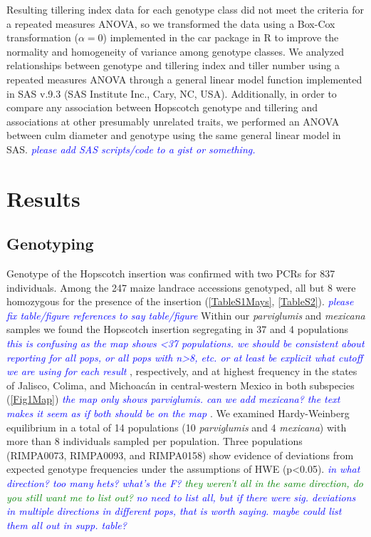 \documentclass[12pt]{article}
\newcommand{\jri}[1]{\textcolor{blue}{ \emph{\scriptsize  #1}} }
\newcommand{\lev}[1]{\textcolor{green}{\emph{\scriptsize #1}} }
\begin{document}
Resulting tillering index data for each genotype class did not meet the criteria for a repeated measures ANOVA, so we transformed the data using a Box-Cox transformation ($\alpha=0$) implemented in the car package in R \citep{FoxWeisberg2011} to improve the normality and homogeneity of variance among genotype classes.  We analyzed relationships between genotype and tillering index and tiller number using a repeated measures ANOVA through a general linear model function implemented in SAS v.9.3 (SAS Institute Inc., Cary, NC, USA). Additionally, in order to compare any association between Hopscotch genotype and tillering and associations at other presumably unrelated traits, we performed an ANOVA between culm diameter and genotype using the same general linear model in SAS. \jri{please add SAS scripts/code to a gist or something. }

\section*{Results}

\subsection*{Genotyping}

Genotype of the Hopscotch insertion was confirmed with two PCRs for 837 individuals. Among the 247 maize landrace accessions genotyped, all but 8 were homozygous for the presence of the insertion (\ref{TableS1Mays}, \ref{TableS2}). \jri{please fix table/figure references to say table/figure} Within our \emph{parviglumis} and \emph{mexicana} samples we found the Hopscotch insertion segregating in 37 and 4 populations \jri{this is confusing as the map shows <37 populations. we should be consistent about reporting for all pops, or all pops with n>8, etc. or at least be explicit what cutoff we are using for each result}, respectively, and at highest frequency in the states of Jalisco, Colima, and Michoac\'{a}n in central-western Mexico in both subspecies (\ref{Fig1Map}) \jri{the map only shows parviglumis. can we add mexicana? the text makes it seem as if both should be on the map}. We examined Hardy-Weinberg equilibrium in a total of 14 populations (10 \emph{parviglumis} and 4 \emph{mexicana}) with more than 8 individuals sampled per population. Three populations (RIMPA0073, RIMPA0093, and RIMPA0158) show evidence of deviations from expected genotype frequencies under the assumptions of HWE (p<0.05).  \jri{in what direction? too many hets? what's the F? } \lev{they weren't all in the same direction, do you still want me to list out?} \jri{no need to list all, but if there were sig. deviations in multiple directions in different pops, that is worth saying. maybe could list them all out in supp. table?}
\end{document}
